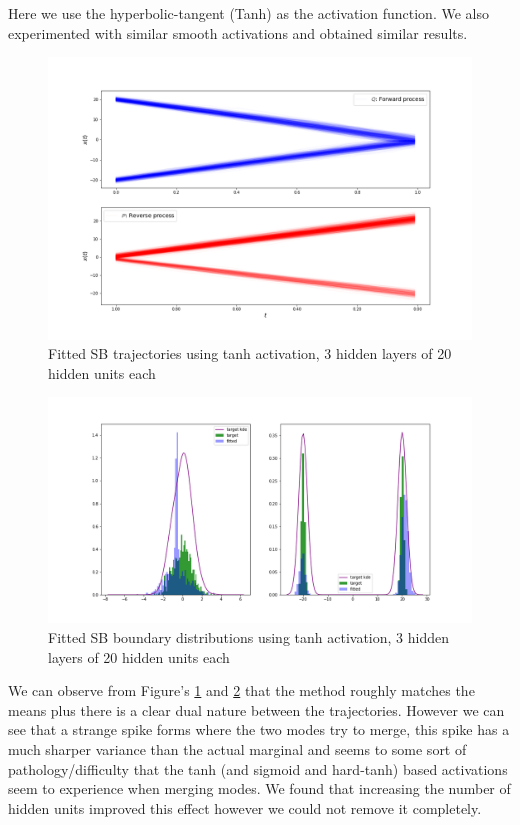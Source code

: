 \documentclass[a4paper,12pt,twoside,openright]{report}
\theoremstyle{definition}
\begin{document}
Here we use the hyperbolic-tangent (Tanh) as the activation function. We also experimented with similar smooth activations and obtained similar results.
\begin{figure}
    \centering
    \includegraphics[scale=0.4,trim={4.3cm 1cm 2.5cm 0}, clip]{images/Control/bimodal_marginals_best_tanh_trajectories.png}
    \caption{ Fitted SB  trajectories using tanh activation, 3 hidden layers of 20 hidden units each}
    \label{fig:trajectoriesbimodtanhnn}
\end{figure}
\begin{figure}
    \centering
    \includegraphics[scale=0.4,trim={4.3cm 1cm 2.5cm 0}, clip]{images/Control/bimodal_marginals_best_tanh.png}
    \caption{ Fitted SB  boundary distributions using tanh activation, 3 hidden layers of 20 hidden units each}
    \label{fig:boundsbimodtanhnn}
\end{figure}
We can observe from Figure's \ref{fig:trajectoriesbimodtanhnn} and \ref{fig:boundsbimodtanhnn} that the method roughly matches the means plus there is a clear dual nature between the trajectories. However we can see that a strange spike forms where the two modes try to merge, this spike has a much sharper variance than the actual marginal and seems to some sort of pathology/difficulty that the tanh (and sigmoid and hard-tanh) based activations seem to experience when merging modes. We found that increasing the number of hidden units improved this effect however we could not remove it completely. 
\end{document}
